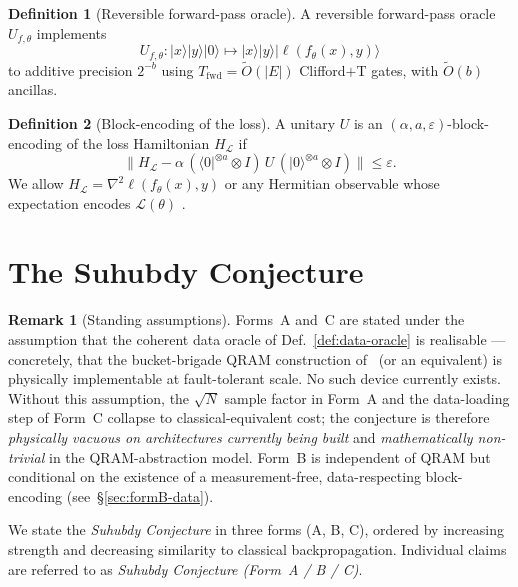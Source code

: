 \documentclass[11pt,a4paper]{article}
\theoremstyle{definition}
\newtheorem{definition}{Definition}
\newtheorem{remark}{Remark}
\newcommand{\Otil}{\widetilde{O}}
\newcommand{\veps}{\varepsilon}
\newcommand{\loss}{\mathcal{L}}
\begin{document}
\begin{definition}[Reversible forward-pass oracle]
\label{def:fwd-oracle}
A reversible forward-pass oracle $U_{f,\theta}$ implements
\[
U_{f,\theta} : |x\rangle|y\rangle|0\rangle \mapsto |x\rangle|y\rangle|\ell(f_\theta(x), y)\rangle
\]
to additive precision $2^{-b}$ using $T_{\text{fwd}} = \Otil(|E|)$ Clifford$+$T gates, with $\Otil(b)$ ancillas.
\end{definition}

\begin{definition}[Block-encoding of the loss]
\label{def:block-encoding}
A unitary $U$ is an $(\alpha, a, \veps)$-block-encoding of the loss Hamiltonian $H_\loss$ if
\[
\bigl\|H_\loss - \alpha\,(\langle 0|^{\otimes a} \otimes I)\,U\,(|0\rangle^{\otimes a} \otimes I)\bigr\| \le \veps.
\]
We allow $H_\loss = \nabla^2 \ell(f_\theta(x), y)$ or any Hermitian observable whose expectation encodes $\loss(\theta)$ \cite{GSLW2019}.
\end{definition}

\section{The Suhubdy Conjecture}\label{sec:conjecture}

\begin{remark}[Standing assumptions]\label{rem:standing}
Forms~A and~C are stated under the assumption that the coherent data oracle of Def.~\ref{def:data-oracle} is realisable --- concretely, that the bucket-brigade QRAM construction of~\cite{GLM2008} (or an equivalent) is physically implementable at fault-tolerant scale. No such device currently exists. Without this assumption, the $\sqrt{N}$ sample factor in Form~A and the data-loading step of Form~C collapse to classical-equivalent cost; the conjecture is therefore \emph{physically vacuous on architectures currently being built} and \emph{mathematically non-trivial} in the QRAM-abstraction model. Form~B is independent of QRAM but conditional on the existence of a measurement-free, data-respecting block-encoding (see~\S\ref{sec:formB-data}).
\end{remark}

We state the \emph{Suhubdy Conjecture} in three forms (A, B, C), ordered by increasing strength and decreasing similarity to classical backpropagation. Individual claims are referred to as \emph{Suhubdy Conjecture (Form~A / B / C)}.
\end{document}
